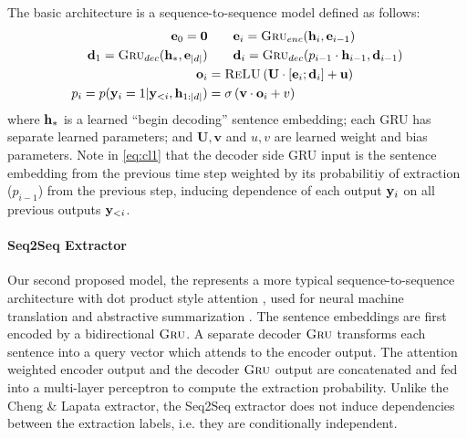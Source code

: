 The basic architecture is a
sequence-to-sequence
model defined as follows:
\begin{align}
    \mathbf{e}_0 = \textbf{0}& \quad \quad   \mathbf{e}_i = \textsc{Gru}_{enc}(\mathbf{h}_i, \mathbf{e}_{i-1}) \\
    \mathbf{d}_1 = \textsc{Gru}_{dec}(\mathbf{h}_*, \mathbf{e}_{| d |}) &\quad\quad
\mathbf{d}_i = \textsc{Gru}_{dec}(p_{i-1} \cdot \mathbf{h}_{i-1}, \mathbf{d}_{i-1}) \label{eq:cl1} \\
\mathbf{o}_i &= \textsc{ReLU}\left(\mathbf{U} \cdot [\mathbf{e}_i; \mathbf{d}_i] + \mathbf{u} \right)\\
p_i = p(\mathbf{y}_i=1|\mathbf{y}_{<i}, \mathbf{h}_{1:| d |}) &= \sigma\left(\mathbf{v}\cdot \mathbf{o}_i + v  \right) 
\end{align}
where $\mathbf{h}_*$ is a learned ``begin decoding'' sentence embedding;
each GRU has separate learned 
parameters; and $\mathbf{U}, \mathbf{v}$ and $u, v$ are learned weight and bias parameters.
Note in \autoref{eq:cl1} that 
the decoder side GRU input is the sentence embedding from the previous time
step weighted by its probabilitiy of extraction ($p_{i-1}$) from the 
previous step, inducing dependence of each output $\mathbf{y}_i$ on all previous 
outputs $\mathbf{y}_{<i}$.



\paragraph{Seq2Seq Extractor \citep{kedzie2018deep}} 
Our second proposed model, the represents a more typical sequence-to-sequence
architecture with dot product style attention \citep{luong2015effective},
used for neural machine translation \cite{bahdanau2014neural} and 
abstractive summarization \cite{see2017get}. 
The sentence embeddings are first
encoded by a bidirectional $\textsc{Gru}$. A separate decoder $\textsc{Gru}$ transforms each 
sentence into a query vector which attends to the encoder output. The
attention weighted encoder output and the decoder $\textsc{Gru}$ output are concatenated
and fed into a multi-layer perceptron to compute the extraction probability.
Unlike the Cheng \& Lapata extractor, the Seq2Seq extractor does not induce 
dependencies between the extraction labels, i.e. they are conditionally independent.

